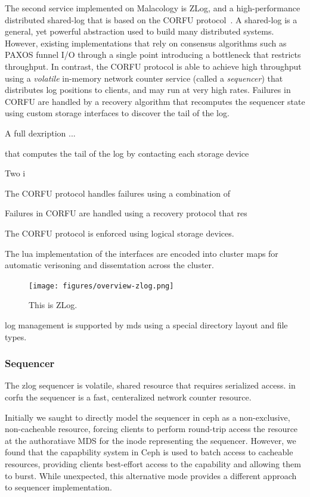 \documentclass[10pt,twocolumn]{article}
\begin{document}
The second service implemented on Malacology is ZLog, and a high-performance
distributed shared-log that is based on the CORFU protocol~\cite{corfu}. A
shared-log is a general, yet powerful abstraction used to build many
distributed systems. However, existing implementations that rely on consensus
algorithms such as PAXOS funnel I/O through a single point introducing a
bottleneck that restricts throughput. In contrast, the CORFU protocol is able
to achieve high throughput using a \emph{volatile} in-memory network counter
service (called a \emph{sequencer}) that distributes log positions to clients,
and may run at very high rates. Failures in CORFU are handled by a recovery
algorithm that recomputes the sequencer state using custom storage interfaces
to discover the tail of the log.

A full dexription ...

that computes the
tail of the log by contacting each storage device

Two i

The CORFU protocol handles failures using a combination of 

Failures in CORFU are handled using a recovery protocol that res

The CORFU protocol is enforced using logical storage devices.

The lua implementation of the interfaces are encoded into cluster maps
for automatic verisoning and dissemtation across the cluster.

\begin{figure}[htbp]
\centering
\texttt{[image: figures/overview-zlog.png]}
\caption{This is ZLog.}
\end{figure}

log management is supported by mds using a special directory layout
and file types.

\subsubsection{Sequencer}

The zlog sequencer is volatile, shared resource that requires serialized
access. in corfu the sequencer is a fast, centeralized network counter
resource.

Initially we saught to directly model the sequencer in ceph as a non-exclusive,
non-cacheable resource, forcing clients to perform round-trip access the
resource at the authoratiave MDS for the inode representing the sequencer.
However, we found that the capapbility system in Ceph is used to batch access
to cacheable resources, providing clients best-effort access to the capability
and allowing them to burst. While unexpected, this alternative mode provides
a different approach to sequencer implementation.
\end{document}
